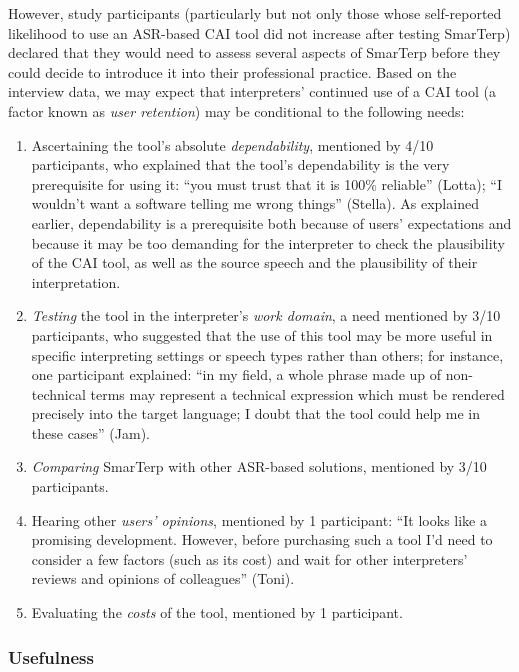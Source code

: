 However, study participants (particularly but not only those whose self-reported likelihood to use an ASR-based CAI tool did not increase after testing SmarTerp) declared that they would need to assess several aspects of SmarTerp before they could decide to introduce it into their professional practice. Based on the interview data, we may expect that interpreters’ continued use of a CAI tool (a factor known as \textit{user retention}) may be conditional to the following needs:
\begin{enumerate}
    \item Ascertaining the tool’s absolute \textit{dependability}, mentioned by 4/10 participants, who explained that the tool’s dependability is the very prerequisite for using it: ``you must trust that it is 100\% reliable'' (Lotta); ``I wouldn’t want a software telling me wrong things'' (Stella). As explained earlier, dependability is a prerequisite both because of users’ expectations and because it may be too demanding for the interpreter to check the plausibility of the CAI tool, as well as the source speech and the plausibility of their interpretation.
    \item \textit{Testing} the tool in the interpreter’s \textit{work domain}, a need mentioned by 3/10 participants, who suggested that the use of this tool may be more useful in specific interpreting settings or speech types rather than others; for instance, one participant explained: ``in my field, a whole phrase made up of non-technical terms may represent a technical expression which must be rendered precisely into the target language; I doubt that the tool could help me in these cases'' (Jam).
    \item \textit{Comparing} SmarTerp with other ASR-based solutions, mentioned by 3/10 participants.
    \item Hearing other \textit{users’ opinions}, mentioned by 1 participant: ``It looks like a promising development. However, before purchasing such a tool I’d need to consider a few factors (such as its cost) and wait for other interpreters’ reviews and opinions of colleagues'' (Toni).
    \item Evaluating the \textit{costs} of the tool, mentioned by 1 participant.
\end{enumerate}


\subsubsection{Usefulness}

